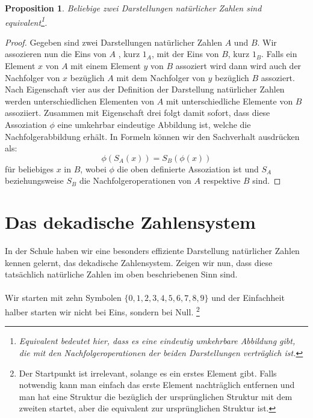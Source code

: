 \documentclass[11pt,a4paper,leqno]{report}
\newtheorem{proposition}{Proposition}[chapter]
\numberwithin{equation}{chapter}
\begin{document}
\begin{proposition}
	Beliebige zwei Darstellungen natürlicher Zahlen sind\\ equivalent\footnote{Equivalent bedeutet hier, dass es eine eindeutig umkehrbare Abbildung gibt, die mit den Nachfolgeroperationen der beiden Darstellungen verträglich ist.}.
\end{proposition}
\begin{proof}
	Gegeben sind zwei Darstellungen natürlicher Zahlen $A$ und $B$. Wir assozieren nun die Eins von $A$ , kurz $1_A$, mit der Eins von $B$, kurz $1_B$. Falls ein Element $x$ von $A$ mit einem Element $y$ von $B$ assoziert wird dann wird auch der Nachfolger von $x$ bezüglich $A$ mit dem Nachfolger von $y$ bezüglich $B$ assoziert. 
	Nach Eigenschaft vier aus der Definition der Darstellung natürlicher Zahlen werden unterschiedlichen Elementen von $A$ mit unterschiedliche Elemente von $B$ assoziiert.
	Zusammen mit Eigenschaft drei folgt damit sofort, dass diese Assoziation $\phi$ eine umkehrbar eindeutige Abbildung ist, welche die Nachfolgerabbildung erhält. In Formeln können wir den Sachverhalt ausdrücken als:
	$$\phi(S_A(x)) = S_B(\phi(x))$$ für beliebiges $x$ in $B$, wobei $\phi$ die oben definierte Assoziation ist und $S_A$ beziehungsweise $S_B$ die Nachfolgeroperationen von $A$ respektive $B$ sind.
\end{proof}
\section{Das dekadische Zahlensystem}
In der Schule haben wir eine besonders effiziente Darstellung natürlicher Zahlen kennen gelernt, das dekadische Zahlensystem. Zeigen wir nun, dass diese tatsächlich natürliche Zahlen im oben beschriebenen Sinn sind.\\
\\
Wir starten mit zehn Symbolen $\{0, 1, 2, 3, 4, 5, 6, 7, 8, 9\}$ und der Einfachheit halber starten wir nicht bei Eins, sondern bei Null. \footnote{Der Startpunkt ist irrelevant, solange es ein erstes Element gibt. Falls notwendig kann man einfach das erste Element nachträglich entfernen und man hat eine Struktur die bezüglich der ursprünglichen Struktur mit dem zweiten startet, aber die equivalent zur ursprünglichen Struktur ist.}
 
\end{document}
